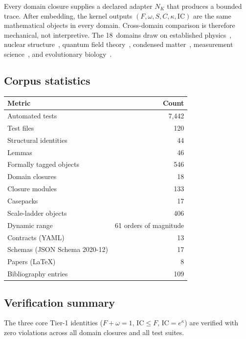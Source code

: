 \documentclass[
  aps,
  prd,
  twocolumn,
  superscriptaddress,
  nofootinbib,
  floatfix
]{revtex4-2}
\newcommand{\IC}{\mathrm{IC}}
\begin{document}
Every domain closure supplies a declared adapter $N_K$ that
produces a bounded trace.  After embedding, the kernel outputs
$(F, \omega, S, C, \kappa, \IC)$ are the same mathematical objects
in every domain.  Cross-domain comparison is therefore mechanical,
not interpretive.  The 18~domains draw on established
physics~\cite{pdg2024,goldstein2002classical,landau1976mechanics,misner1973gravitation},
nuclear structure~\cite{weizsacker1935,bethe1936},
quantum field theory~\cite{gross1973,politzer1973,higgs1964,wilson1974confinement},
condensed matter~\cite{laughlin1983fqhe,kitaev2003toric},
measurement science~\cite{jcgm2008gum},
and evolutionary biology~\cite{darwin1859origin}.

\subsection{Corpus statistics}

{\small
\begin{center}
\begin{tabular}{@{}lr@{}}
\toprule
Metric & Count \\
\midrule
Automated tests & 7{,}442 \\
Test files & 120 \\
Structural identities & 44 \\
Lemmas & 46 \\
Formally tagged objects & 546 \\
Domain closures & 18 \\
Closure modules & 133 \\
Casepacks & 17 \\
Scale-ladder objects & 406 \\
Dynamic range & 61 orders of magnitude \\
Contracts (YAML) & 13 \\
Schemas (JSON Schema 2020-12) & 17 \\
Papers (LaTeX) & 8 \\
Bibliography entries & 109 \\
\bottomrule
\end{tabular}
\end{center}}

\subsection{Verification summary}

The three core Tier-1 identities ($F + \omega = 1$,
$\IC \leq F$, $\IC = e^\kappa$) are verified with zero violations
across all domain closures and all test suites.
\end{document}
